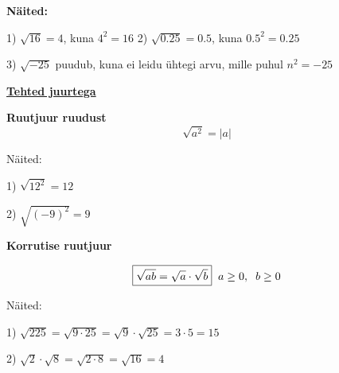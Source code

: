\begin{center}
{{{\begin{flushleft}
\vspace{2mm}
\hspace{5mm}
\textbf{Näited:}

\vspace{2mm}
\hspace{5mm}
1) $\sqrt{16}=4$, kuna $4^{2}=16$ \hspace{20mm} 2) $\sqrt{0.25}=0.5$, kuna $0.5^{2}=0.25$

\vspace{2mm}
\hspace{5mm}
3) $\sqrt{-25}$ puudub, kuna ei leidu ühtegi arvu, mille puhul $n^{2}=-25$ 

\vspace{5mm}
\hspace{5mm}
\textbf{\underline{Tehted juurtega}}

\vspace{5mm}
\hspace{5mm}
\textbf{Ruutjuur ruudust}
\begin{equation}
\label{35_eq1}
\boxed{\sqrt{a^{2}}=|a|} 
\end{equation}

\hspace{5mm} Näited:

\vspace{2mm}
\hspace{5mm}
1) $\sqrt{12^{2}}=12$

\vspace{2mm}
\hspace{5mm}
2) $\sqrt{(-9)^{2}}=9$

\vspace{5mm}
\hspace{5mm}
\textbf{Korrutise ruutjuur}

\vspace{2mm}
\begin{equation}
\label{35_eq2}
\boxed{\sqrt{ab}=\sqrt{a} \cdot \sqrt{b}} \hspace{2mm} a \geq 0, \hspace{2mm} b \geq 0
\end{equation}

\hspace{5mm}
Näited:

\vspace{2mm}
\hspace{5mm}
1) $\sqrt{225}=\sqrt{9 \cdot 25}=\sqrt{9} \cdot \sqrt{25}=3 \cdot 5= 15$

\vspace{2mm}
\hspace{5mm}
2) $\sqrt{2}\cdot \sqrt{8}=\sqrt{2\cdot 8}=\sqrt{16}=4$


\end{flushleft}}}}
\end{center}
